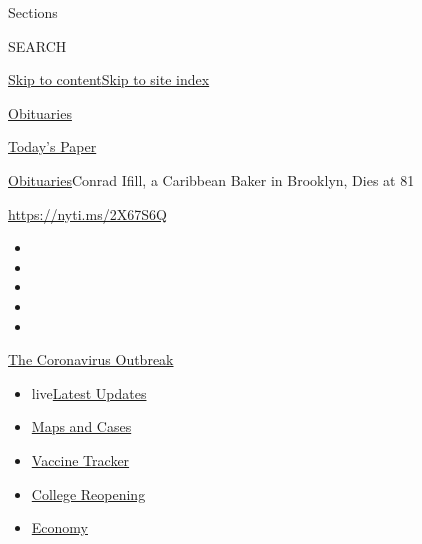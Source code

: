 Sections

SEARCH

\protect\hyperlink{site-content}{Skip to
content}\protect\hyperlink{site-index}{Skip to site index}

\href{https://www.nytimes.com/section/obituaries}{Obituaries}

\href{https://myaccount.nytimes.com/auth/login?response_type=cookie\&client_id=vi}{}

\href{https://www.nytimes.com/section/todayspaper}{Today's Paper}

\href{/section/obituaries}{Obituaries}\textbar{}Conrad Ifill, a
Caribbean Baker in Brooklyn, Dies at 81

\url{https://nyti.ms/2X67S6Q}

\begin{itemize}
\item
\item
\item
\item
\item
\end{itemize}

\href{https://www.nytimes.com/news-event/coronavirus?action=click\&pgtype=Article\&state=default\&region=TOP_BANNER\&context=storylines_menu}{The
Coronavirus Outbreak}

\begin{itemize}
\tightlist
\item
  live\href{https://www.nytimes.com/2020/08/03/world/coronavirus-covid-19.html?action=click\&pgtype=Article\&state=default\&region=TOP_BANNER\&context=storylines_menu}{Latest
  Updates}
\item
  \href{https://www.nytimes.com/interactive/2020/us/coronavirus-us-cases.html?action=click\&pgtype=Article\&state=default\&region=TOP_BANNER\&context=storylines_menu}{Maps
  and Cases}
\item
  \href{https://www.nytimes.com/interactive/2020/science/coronavirus-vaccine-tracker.html?action=click\&pgtype=Article\&state=default\&region=TOP_BANNER\&context=storylines_menu}{Vaccine
  Tracker}
\item
  \href{https://www.nytimes.com/2020/08/02/us/covid-college-reopening.html?action=click\&pgtype=Article\&state=default\&region=TOP_BANNER\&context=storylines_menu}{College
  Reopening}
\item
  \href{https://www.nytimes.com/live/2020/08/03/business/stock-market-today-coronavirus?action=click\&pgtype=Article\&state=default\&region=TOP_BANNER\&context=storylines_menu}{Economy}
\end{itemize}

